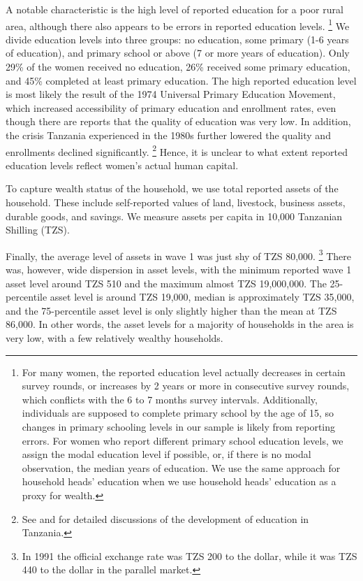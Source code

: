 \documentclass[letterpaper,12pt]{article}
\begin{document}
A notable characteristic is the high level of reported education for a poor 
rural area, although there also appears to be errors in 
reported education levels.%
\footnote{
For many women, the reported education level actually decreases in certain survey 
rounds, or increases by 2 years or more in consecutive survey rounds, which 
conflicts with the 6 to 7 months survey intervals. 
Additionally, individuals are supposed to complete primary school by the age of 15,
so changes in primary schooling levels in our sample is likely from reporting 
errors. 
For women who report different primary school education levels, we 
assign the modal education level if possible, or, if there is no modal 
observation, the median years of education.
We use the same approach for household heads' education
when we use household heads' education as a proxy for wealth.
}
We divide education levels into three groups: no education, 
some primary (1-6 years of education), and primary school 
or above (7 or more years of education).
Only 29\% of the women received no education, 26\% received some 
primary education, and 45\% completed at least primary education.
The high reported education level is most likely the result of the 1974 
Universal Primary Education Movement,
which increased accessibility of primary education and enrollment rates, 
even though there are reports that the quality of education was very low.
In addition, the crisis Tanzania experienced in the 1980s further lowered the 
quality and enrollments declined significantly.%
\footnote{See \cite{Galabawa2001} and \cite{Wedgwood2005} for detailed discussions 
of the development of education in Tanzania.
}
Hence, it is unclear to what extent reported education levels reflect 
women's actual human capital.

To capture wealth status of the household, we use total reported assets of the 
household.
These include self-reported values of land, livestock, business assets, durable
goods, and savings.
We measure assets per capita in 10,000 Tanzanian Shilling (TZS).

Finally, the average level of assets in wave 1 was just shy of TZS 80,000.%
\footnote{%
In 1991 the official exchange rate was TZS 200 to the dollar, while it
was TZS 440 to the dollar in the parallel market.
}
There was, however, wide dispersion in asset levels, with the minimum reported 
wave 1 asset level around TZS 510 and the maximum almost TZS 19,000,000.
The 25-percentile asset level is around TZS 19,000, median is approximately 
TZS 35,000, and the 75-percentile asset level is only slightly higher than the 
mean at TZS 86,000.
In other words, the asset levels for a majority of households in the area is very low,
with a few relatively wealthy households.
\end{document}
